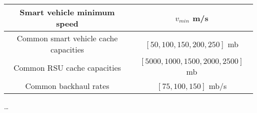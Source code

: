 \begin{longtable}{c|c}
    \hline
    Smart vehicle minimum speed           & $v_{min}$ m/s                                                                        \\
    \hline
    Common smart vehicle cache capacities & $[50, 100, 150, 200, 250]$ mb                                                        \\
    \hline
    Common RSU cache capacities           & $[5000,1000,1500,2000,2500]$ mb                                                      \\
    \hline
    Common backhaul rates                 & $[75, 100, 150]$ mb/s                                                                \\
    \hline
\end{longtable}


\ldots
